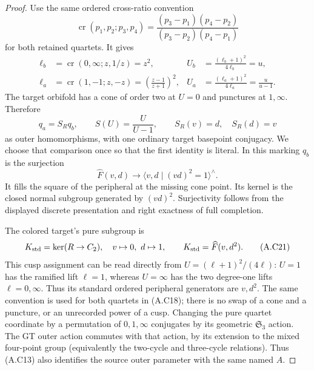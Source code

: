 \begin{proof}
Use the same ordered cross-ratio convention
\[
 \operatorname{cr}(p_1,p_2;p_3,p_4)
 =\frac{(p_3-p_1)(p_4-p_2)}{(p_3-p_2)(p_4-p_1)}
\]
for both retained quartets.  It gives
\[
\begin{aligned}
 \ell_b&=\operatorname{cr}(0,\infty;z,1/z)=z^2,
 &U_b&=\frac{(\ell_b+1)^2}{4\ell_b}=u,\\
 \ell_a&=\operatorname{cr}(1,-1;z,-z)
                  =\left(\frac{z-1}{z+1}\right)^2,
 &U_a&=\frac{(\ell_a+1)^2}{4\ell_a}=\frac{u}{u-1}.
\end{aligned}                                                \tag{A.C18}
\]
The target orbifold has a cone of order two at $U=0$
and punctures at $1,\infty$.  Therefore
\[
 q_a=S_Rq_b,\qquad S(U)=\frac U{U-1},\qquad
 S_R(v)=d,\quad S_R(d)=v                              \tag{A.C19}
\]
as outer homomorphisms, with one ordinary target basepoint
conjugacy.  We choose that comparison once so that the first
identity is literal.  In this marking $q_b$ is the surjection
\[
 \widehat F(v,d)\longrightarrow
       \langle v,d\mid(vd)^2=1\rangle^{\wedge}.             \tag{A.C20}
\]
It fills the square of the peripheral at the missing cone
point.  Its kernel is the closed normal subgroup generated
by $(vd)^2$.  Surjectivity follows from the displayed discrete
presentation and right exactness of full completion.

The colored target's pure subgroup is
\[
 K_{\rm std}=\ker(R\to C_2),\quad v\mapsto0,
 \ d\mapsto1,\qquad K_{\rm std}=\widehat F(v,d^2).        \tag{A.C21}
\]
This cusp assignment can be read directly from
$U=(\ell+1)^2/(4\ell)$: $U=1$ has the ramified lift
$\ell=1$, whereas $U=\infty$ has the two degree-one
lifts $\ell=0,\infty$.  Thus its standard ordered
peripheral generators are $v,d^2$.  The same convention
is used for both quartets in (A.C18); there is no swap of
a cone and a puncture, or an unrecorded power of a cusp.
Changing the pure quartet coordinate by a permutation of
$0,1,\infty$ conjugates by its geometric
$\mathfrak S_3$ action.  The GT outer action commutes with
that action, by its extension to the mixed four-point
group (equivalently the two-cycle and three-cycle
relations).  Thus (A.C13) also identifies the source
outer parameter with the same named $A$.


\end{proof}

